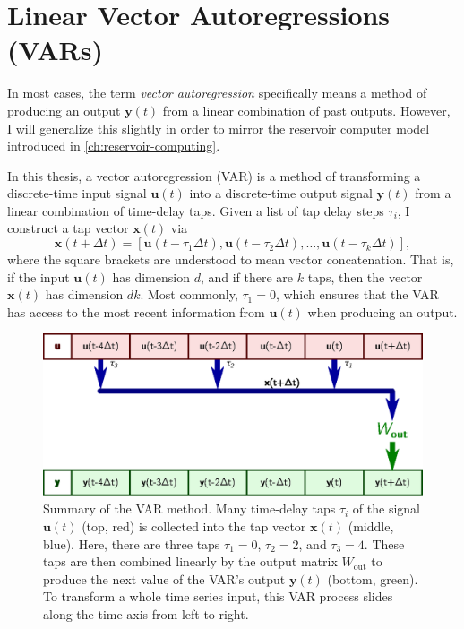 \section{Linear Vector Autoregressions (VARs)}

In most cases, the term \emph{vector autoregression} specifically
means a method of producing an output $\bm{y}(t)$ from a linear
combination of past outputs. However, I will generalize this slightly
in order to mirror the reservoir computer model introduced in
\cref{ch:reservoir-computing}.

In this thesis, a vector autoregression (VAR) is a method of
transforming a discrete-time input signal $\bm{u}(t)$ into a
discrete-time output signal $\bm{y}(t)$ from a linear combination of
time-delay taps. Given a list of tap delay steps $\tau_i$, I construct
a tap vector $\bm{x}(t)$ via
\begin{equation}
  \label{eq:var-x}
  \bm{x}(t + \Delta t) = [\bm{u}(t - \tau_1 \Delta t), \bm{u}(t - \tau_2 \Delta t), \dots, \bm{u}(t - \tau_k \Delta t)],
\end{equation}
where the square brackets are understood to mean vector
concatenation. That is, if the input $\bm{u}(t)$ has dimension $d$,
and if there are $k$ taps, then the vector $\bm{x}(t)$ has dimension
$dk$. Most commonly, $\tau_1 = 0$, which ensures that the VAR has access to the most recent information from $\bm{u}(t)$ when producing an output.

\begin{figure}
  \includegraphics{figures/var-infer}
  \caption{Summary of the VAR method. Many time-delay taps $\tau_i$ of
    the signal $\bm{u}(t)$ (top, red) is collected into the tap vector
    $\bm{x}(t)$ (middle, blue). Here, there are three taps $\tau_1=0$,
    $\tau_2=2$, and $\tau_3=4$. These taps are then combined linearly
    by the output matrix $W_\text{out}$ to produce the next value of
    the VAR's output $\bm{y}(t)$ (bottom, green). To transform a whole
    time series input, this VAR process slides along the time axis
    from left to right.}
  \label{fig:var-infer}
\end{figure}

